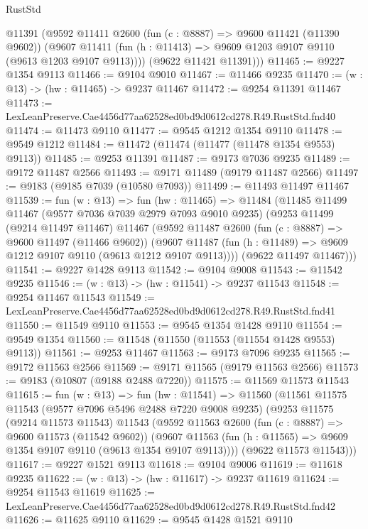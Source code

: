 \begin{lexlean}{RustStd}
\begin{coremodule}
        @11391
        (@9592
          @11411
          @2600
          (fun (c : @8887) => @9600 @11421 (@11390 @9602))
          (@9607 @11411 (fun (h : @11413) => @9609 @1203 @9107 @9110 (@9613 @1203 @9107 @9113))))
        (@9622 @11421 @11391)))
@11465 := @9227 @1354 @9113
@11466 := @9104 @9010
@11467 := @11466 @9235
@11470 := (w : @13) -> (hw : @11465) -> @9237 @11467
@11472 := @9254 @11391 @11467
@11473 := LexLeanPreserve.Cae4456d77aa62528ed0bd9d0612cd278.R49.RustStd.fnd40
@11474 := @11473 @9110
@11477 := @9545 @1212 @1354 @9110
@11478 := @9549 @1212
@11484 := @11472 (@11474 (@11477 (@11478 @1354 @9553) @9113))
@11485 := @9253 @11391
@11487 := @9173 @7036 @9235
@11489 := @9172 @11487 @2566
@11493 := @9171 @11489 (@9179 @11487 @2566)
@11497 := @9183 (@9185 @7039 (@10580 @7093))
@11499 := @11493 @11497 @11467
@11539 := fun (w : @13) =>
  fun (hw : @11465) =>
  @11484
    (@11485
      @11499
      @11467
      (@9577 @7036 @7039 @2979 @7093 @9010 @9235)
      (@9253
        @11499
        (@9214 @11497 @11467)
        @11467
        (@9592
          @11487
          @2600
          (fun (c : @8887) => @9600 @11497 (@11466 @9602))
          (@9607 @11487 (fun (h : @11489) => @9609 @1212 @9107 @9110 (@9613 @1212 @9107 @9113))))
        (@9622 @11497 @11467)))
@11541 := @9227 @1428 @9113
@11542 := @9104 @9008
@11543 := @11542 @9235
@11546 := (w : @13) -> (hw : @11541) -> @9237 @11543
@11548 := @9254 @11467 @11543
@11549 := LexLeanPreserve.Cae4456d77aa62528ed0bd9d0612cd278.R49.RustStd.fnd41
@11550 := @11549 @9110
@11553 := @9545 @1354 @1428 @9110
@11554 := @9549 @1354
@11560 := @11548 (@11550 (@11553 (@11554 @1428 @9553) @9113))
@11561 := @9253 @11467
@11563 := @9173 @7096 @9235
@11565 := @9172 @11563 @2566
@11569 := @9171 @11565 (@9179 @11563 @2566)
@11573 := @9183 (@10807 (@9188 @2488 @7220))
@11575 := @11569 @11573 @11543
@11615 := fun (w : @13) =>
  fun (hw : @11541) =>
  @11560
    (@11561
      @11575
      @11543
      (@9577 @7096 @5496 @2488 @7220 @9008 @9235)
      (@9253
        @11575
        (@9214 @11573 @11543)
        @11543
        (@9592
          @11563
          @2600
          (fun (c : @8887) => @9600 @11573 (@11542 @9602))
          (@9607 @11563 (fun (h : @11565) => @9609 @1354 @9107 @9110 (@9613 @1354 @9107 @9113))))
        (@9622 @11573 @11543)))
@11617 := @9227 @1521 @9113
@11618 := @9104 @9006
@11619 := @11618 @9235
@11622 := (w : @13) -> (hw : @11617) -> @9237 @11619
@11624 := @9254 @11543 @11619
@11625 := LexLeanPreserve.Cae4456d77aa62528ed0bd9d0612cd278.R49.RustStd.fnd42
@11626 := @11625 @9110
@11629 := @9545 @1428 @1521 @9110

\end{coremodule}
\end{lexlean}
